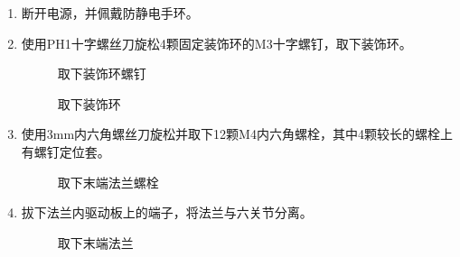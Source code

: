 \documentclass[a4paper,11pt,english,openany,oneside]{sphinxmanual}
\begin{document}
\sphinxAtStartPar
{}
\begin{enumerate}
%
\item {} 
\sphinxAtStartPar
断开电源，并佩戴防静电手环。

\item {} 
\sphinxAtStartPar
使用PH1十字螺丝刀旋松4颗固定装饰环的M3十字螺钉，取下装饰环。

\begin{figure}[H]
\centering
\capstart

\noindent{}
\caption{取下装饰环螺钉}\label{\detokenize{_u66f4_u6362_u672b_u7aef_u6cd5_u5170:id9}}\end{figure}

\begin{figure}[H]
\centering
\capstart

\noindent{}
\caption{取下装饰环}\label{\detokenize{_u66f4_u6362_u672b_u7aef_u6cd5_u5170:id10}}\end{figure}

\item {} 
\sphinxAtStartPar
使用3mm内六角螺丝刀旋松并取下12颗M4内六角螺栓，其中4颗较长的螺栓上有螺钉定位套。

\begin{figure}[H]
\centering
\capstart

\noindent{}
\caption{取下末端法兰螺栓}\label{\detokenize{_u66f4_u6362_u672b_u7aef_u6cd5_u5170:id11}}\end{figure}

\item {} 
\sphinxAtStartPar
拔下法兰内驱动板上的端子，将法兰与六关节分离。

\begin{figure}[H]
\centering
\capstart

\noindent{}
\caption{取下末端法兰}\label{\detokenize{_u66f4_u6362_u672b_u7aef_u6cd5_u5170:id12}}\end{figure}

\end{enumerate}
\end{document}
